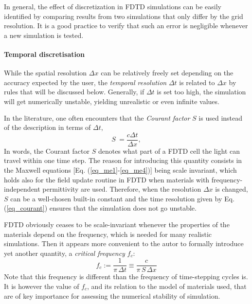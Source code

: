 In general, the effect of discretization in FDTD simulations can be easily identified by comparing results from two simulations that only differ by the grid resolution. It is a good practice to verify that such an error is negligible whenever a new simulation is tested.
\paragraph{Temporal discretisation} %
While the spatial resolution $\Delta x$ can be relatively freely set depending on the accuracy expected by the user, the \textit{temporal resolution} $\Delta t$ is related to $\Delta x$ by rules that will be discussed below. Generally, if $\Delta t$ is set too high, the simulation will get numerically unstable, yielding unrealistic or even infinite values.  %

In the literature, one often encounters that the \textit{Courant factor} $S$ is used instead of the description in terms of $\Delta t$,
\begin{equation} S~= \frac{c \Delta t}{\Delta x}, \label{eq_courant}\end{equation}
In words, the Courant factor $S$ denotes what part of a FDTD cell the light can travel within one time step. 
The reason for introducing this quantity consists in the Maxwell equations [Eq. (\ref{eq_me1}-\ref{eq_me4})] being scale invariant, which holds also for the field update routine in FDTD when materials with frequency-independent permittivity are used. Therefore, when the resolution $\Delta x$ is changed, $S$ can be a well-chosen built-in constant and the time resolution given by Eq. (\ref{eq_courant}) ensures that the simulation does not go unstable.

FDTD obviously ceases to be scale-invariant whenever the properties of the materials depend on the frequency, which is needed for many realistic simulations. Then it appears more convenient to the autor to formally introduce yet another quantity, a \textit{critical frequency} $f_c$:
\begin{equation} f_c := \frac{1}{\pi \, \Delta t} \equiv \frac{c}{\pi\, S\, \Delta x} \label{eq_fc}\end{equation}
Note that this frequency is different %
than the frequency of time-stepping cycles is. It is however the value of $f_c$, and its relation to the model of materials used, that are of key importance for assessing the numerical stability of simulation. %

